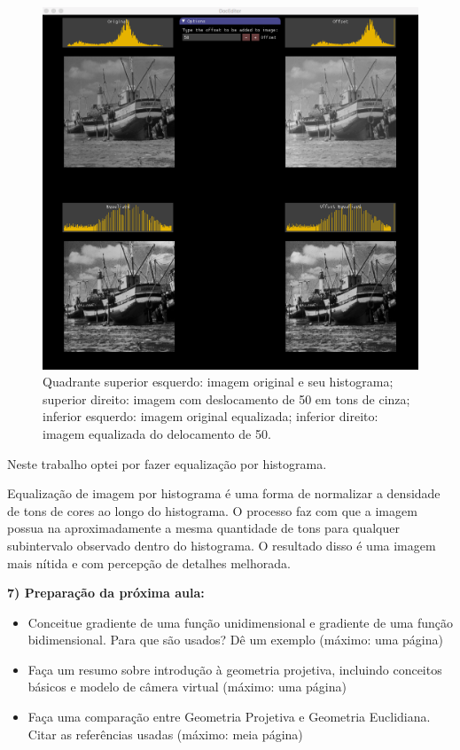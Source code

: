 \documentclass[a4paper]{sbgames}               %
\begin{document}
\begin{figure} [h!]
  \centering 
  \includegraphics[width=0.95\linewidth]{imgs/equalized}
 \caption{Quadrante superior esquerdo: imagem original e seu histograma; superior direito: imagem com deslocamento de 50 em tons de cinza; inferior esquerdo: imagem original equalizada; inferior direito: imagem equalizada do delocamento de 50. } 
 \label{fig:burstgoogle} 
\end{figure}

Neste trabalho optei por fazer equalização por histograma.

Equalização de imagem por histograma é uma forma de normalizar a densidade de tons de cores ao longo do histograma. O processo faz com que a imagem possua na aproximadamente a mesma quantidade de tons para qualquer subintervalo observado dentro do histograma. O resultado disso é uma imagem mais nítida e com percepção de detalhes melhorada. 

\textbf{7) Preparação da próxima aula:}
\begin{itemize}
\item Conceitue gradiente de uma função unidimensional e gradiente de uma função bidimensional. Para que são usados? Dê um exemplo (máximo: uma página)
\item Faça um resumo sobre introdução à geometria projetiva, incluindo conceitos básicos e modelo de câmera virtual (máximo: uma página)
\item Faça uma comparação entre Geometria Projetiva e Geometria Euclidiana. Citar as referências usadas (máximo: meia página)
\end{itemize}





\end{document}
